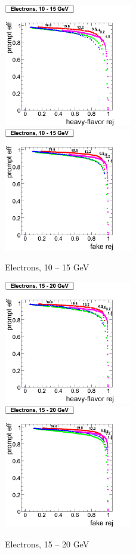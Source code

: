 \begin{figure}[htbp]
   \includegraphics[width = 0.5\textwidth]{pictures/bkgdRej_sigEff/elec_nonPrompt_ptCut1_ptCut2.png}
   \includegraphics[width = 0.5\textwidth]{pictures/bkgdRej_sigEff/elec_fake_ptCut1_ptCut2.png}
   \caption{Electrons, 10 -- 15 GeV}
   \label{fig:elec_ptCut1_ptCut2}
\end{figure}

\begin{figure}[htbp]
   \includegraphics[width = 0.5\textwidth]{pictures/bkgdRej_sigEff/elec_nonPrompt_ptCut2_ptCut3.png}
   \includegraphics[width = 0.5\textwidth]{pictures/bkgdRej_sigEff/elec_fake_ptCut2_ptCut3.png}
   \caption{Electrons, 15 -- 20 GeV}
   \label{fig:elec_ptCut2_ptCut3}
\end{figure}

